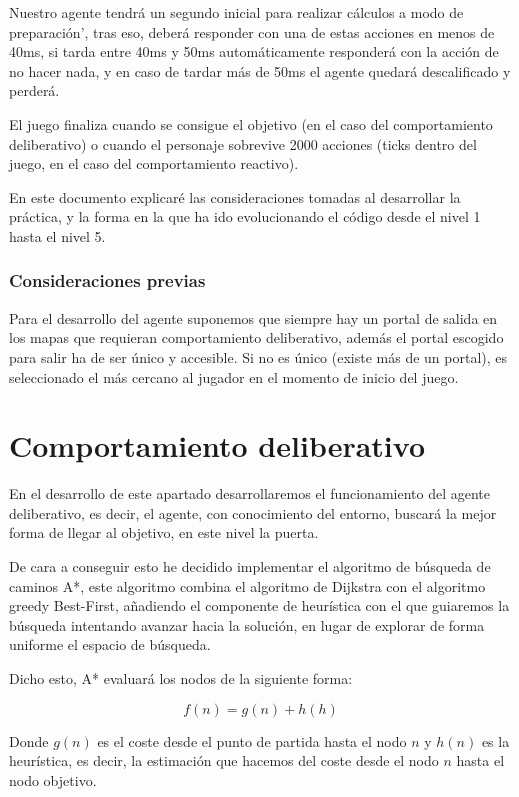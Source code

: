 \documentclass[10pt, spanish]{article}
\begin{document}
Nuestro agente tendrá un segundo inicial para realizar cálculos a modo de preparación', tras eso, deberá responder con una de estas acciones en menos de 40ms, si tarda entre 40ms y 50ms automáticamente responderá con la acción de no hacer nada, y en caso de tardar más de 50ms el agente quedará descalificado y perderá.

El juego finaliza cuando se consigue el objetivo (en el caso del comportamiento deliberativo) o cuando el personaje sobrevive 2000 acciones (ticks dentro del juego, en el caso del comportamiento reactivo).

En este documento explicaré las consideraciones tomadas al desarrollar la práctica, y la forma en la que ha ido evolucionando el código desde el nivel 1 hasta el nivel 5.

\subsubsection{Consideraciones previas}

Para el desarrollo del agente suponemos que siempre hay un portal de salida en los mapas que requieran comportamiento deliberativo, además el portal escogido para salir ha de ser único y accesible. Si no es único (existe más de un portal), es seleccionado el más cercano al jugador en el momento de inicio del juego.

\section{Comportamiento deliberativo}

En el desarrollo de este apartado desarrollaremos el funcionamiento del agente deliberativo, es decir, el agente, con conocimiento del entorno, buscará la mejor forma de llegar al objetivo, en este nivel la puerta.

De cara a conseguir esto he decidido implementar el algoritmo de búsqueda de caminos A*, este algoritmo combina el algoritmo de Dijkstra con el algoritmo greedy Best-First, añadiendo el componente de heurística con el que guiaremos la búsqueda intentando avanzar hacia la solución, en lugar de explorar de forma uniforme el espacio de búsqueda.

Dicho esto, A* evaluará los nodos de la siguiente forma:

$$ f(n) = g(n) + h(h) $$

Donde $g(n)$ es el coste desde el punto de partida hasta el nodo $n$ y $h(n)$ es la heurística, es decir, la estimación que hacemos del coste desde el nodo $n$ hasta el nodo objetivo.
\end{document}
